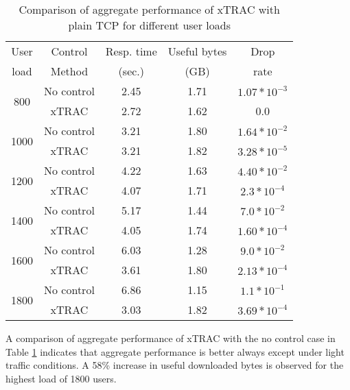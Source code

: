 \documentclass[conference]{../../IEEEtran}
\begin{document}
\begin{table}[hbt]
\footnotesize
 \caption{Comparison of aggregate performance of xTRAC with plain TCP for different user loads}
 \label{tab:cmpaggall}
 \centering
 \begin{tabular}{|c|c|c|c|c|}
 \hline
  User& Control & Resp. time & Useful bytes & Drop  \\
  load& Method &(sec.)& (GB)&rate\\
 \hline
 \multirow{2}{*}{800}&No control&2.45&1.71&$1.07*10^{-3}$\\
 \cline{2-5}
 &xTRAC&2.72&1.62&0.0\\
 \hline
  \multirow{2}{*}{1000}&No control&3.21&1.80&$1.64*10^{-2}$\\
 \cline{2-5}
 &xTRAC&3.21&1.82&$3.28*10^{-5}$\\
 \hline
 \multirow{2}{*}{1200}&No control&4.22&1.63&$4.40*10^{-2}$\\
 \cline{2-5}
 &xTRAC&4.07&1.71&$2.3*10^{-4}$\\
 \hline
 \multirow{2}{*}{1400}&No control&5.17&1.44&$7.0*10^{-2}$\\
 \cline{2-5}
 &xTRAC&4.05&1.74&$1.60*10^{-4}$\\
 \hline
 \multirow{2}{*}{1600}&No control&6.03&1.28&$9.0*10^{-2}$\\
 \cline{2-5}
 &xTRAC&3.61&1.80&$2.13*10^{-4}$\\
 \hline
 \multirow{2}{*}{1800}&No control&6.86&1.15&$1.1*10^{-1}$\\
 \cline{2-5}
 &xTRAC&3.03&1.82&$3.69*10^{-4}$\\
 \hline 
 \end{tabular}
\end{table}

A comparison of aggregate performance of xTRAC with the no control case in Table \ref{tab:cmpaggall} indicates that aggregate performance is better always except under light traffic conditions. A 58\% increase in useful downloaded bytes is observed for the highest load of 1800 users.
\end{document}
